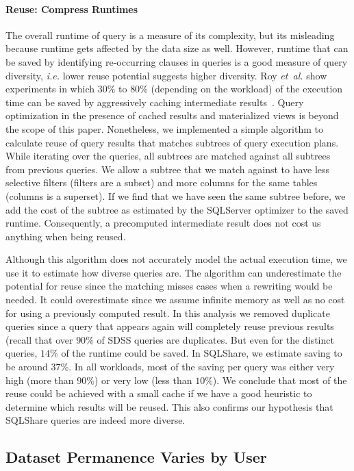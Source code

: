 \documentclass{sig-alternate}
\newcommand{\ie}{{\em i.e.}\xspace}
\newcommand{\ea}{{\em et~al.}\xspace}
\newcommand{\sqlshare}{SQLShare}
\begin{document}
\paragraph*{Reuse: Compress Runtimes}
\label{sec:reuse}
The overall runtime of query is a measure of its complexity, but its misleading because runtime gets affected by the data size as well. 
However, runtime that can be saved by identifying re-occurring clauses in queries is a good measure of query diversity, \ie lower reuse potential suggests higher diversity.
Roy \ea show experiments in which $30\%$ to $80\%$ (depending on the workload) of the execution time can be saved by aggressively caching intermediate results~\cite{roy2000don}.
Query optimization in the presence of cached results and materialized views is beyond the scope of this paper.
Nonetheless, we implemented a simple algorithm to calculate reuse of query results that matches subtrees of query execution plans.
While iterating over the queries, all subtrees are matched against all subtrees from previous queries.
We allow a subtree that we match against to have less selective filters (filters are a subset) and more columns for the same tables (columns is a superset).
If we find that we have seen the same subtree before, we add the cost of the subtree as estimated by the SQLServer optimizer to the saved runtime.
Consequently, a precomputed intermediate result does not cost us anything when being reused.

Although this algorithm does not accurately model the actual execution time, we use it to estimate how diverse queries are.
The algorithm can underestimate the potential for reuse since the matching misses cases when a rewriting would be needed.
It could overestimate since we assume infinite memory as well as no cost for using a previously computed result.
In this analysis we removed duplicate queries since a query that appears again will completely reuse previous results (recall that over $90\%$ of SDSS queries are duplicates. But even for the distinct queries, $14\%$ of the runtime could be saved.
In SQLShare, we estimate saving to be around $37\%$.
In all workloads, most of the saving per query was either very high (more than $90\%$) or very low (less than $10\%$).
We conclude that most of the reuse could be achieved with a small cache if we have a good heuristic to determine which results will be reused. This also confirms our hypothesis that \sqlshare{} queries are indeed more diverse.


\subsection{Dataset Permanence Varies by User}
\end{document}
